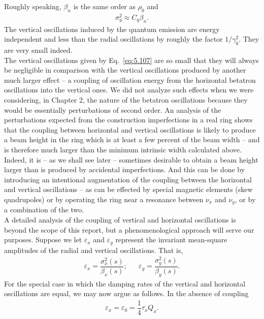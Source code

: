 Roughly speaking, $\beta_n$ is the same order as $\rho_0$ and
\begin{align}
	\sigma_y^2 \approx C_q \beta_n.
\end{align}
The vertical oscillations induced by the quantum emission are energy independent and less than the radial oscillations by roughly the factor $1/\gamma_0^2$. They are very small indeed.\\
The vertical oscillations given by Eq.~\eqref{eq:5.107} are so small that they will always be negligible in comparison with the vertical oscillations produced by another much larger effect -- a coupling of oscillation energy from the horizontal betatron oscillations into the vertical
 ones. We did not analyze such effects when we were considering, in Chapter 2, the nature of the betatron oscillations because they would be essentially perturbations of second order. An analysis of the perturbations expected from the construction imperfections in a real ring shows that the coupling between horizontal and vertical oscillations is likely to produce a beam height in the ring which is at least a few percent of the beam width -- and is therefore much larger than the minimum intrinsic width calculated above.\\
Indeed, it is -- as we shall see later -- sometimes desirable to obtain a beam height larger than is produced by accidental imperfections. And this can be done by introducing an intentional
 augmentation of the coupling between the horizontal and vertical oscillations -- as can be effected by special magnetic elements (skew quadrupoles) or by operating the ring near a resonance between $\nu_x$ and $\nu_y$, or by a combination of the two.\\
A detailed analysis of the coupling of vertical and horizontal oscillations is beyond the scope of this report, but a phenomenological approach will serve our purposes. Suppose we let $\varepsilon_x$ and $\varepsilon_y$ represent the invariant mean-square amplitudes of the radial and vertical oscillations. That is,
\begin{align} \label{eq:5.109}
	\varepsilon_x = \dfrac{\sigma_x^2(s)}{\beta_x(s)}; && \varepsilon_y = \dfrac{\sigma_y^2(s)}{\beta_y(s)}.
\end{align}
For the special case in which the damping rates of the vertical and horizontal oscillations are equal, we may now argue as follows. In the absence of coupling
\begin{align}
	\varepsilon_x = \varepsilon_0 = \dfrac{1}{4} \tau_x Q_x.
\end{align}
